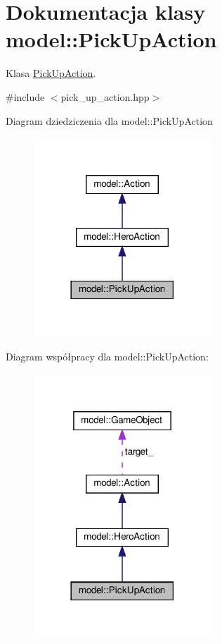 \hypertarget{classmodel_1_1PickUpAction}{}\section{Dokumentacja klasy model\+:\+:Pick\+Up\+Action}
\label{classmodel_1_1PickUpAction}


Klasa \hyperlink{classmodel_1_1PickUpAction}{Pick\+Up\+Action}.  




{\ttfamily \#include $<$pick\+\_\+up\+\_\+action.\+hpp$>$}



Diagram dziedziczenia dla model\+:\+:Pick\+Up\+Action\nopagebreak
\begin{figure}[H]
\begin{center}
\leavevmode
\includegraphics[width=189pt]{classmodel_1_1PickUpAction__inherit__graph}
\end{center}
\end{figure}


Diagram współpracy dla model\+:\+:Pick\+Up\+Action\+:\nopagebreak
\begin{figure}[H]
\begin{center}
\leavevmode
\includegraphics[width=189pt]{classmodel_1_1PickUpAction__coll__graph}
\end{center}
\end{figure}

